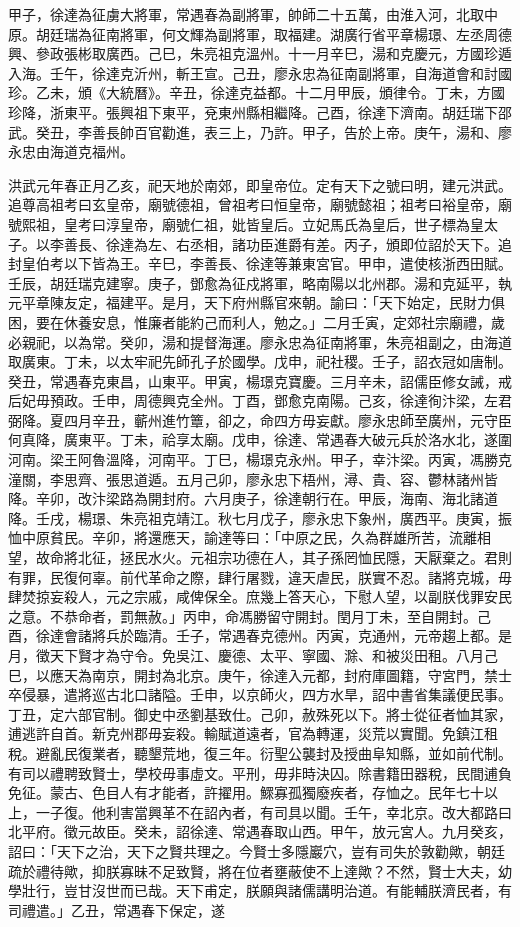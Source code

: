 \begin{pinyinscope}
甲子，徐達為征虜大將軍，常遇春為副將軍，帥師二十五萬，由淮入河，北取中原。胡廷瑞為征南將軍，何文輝為副將軍，取福建。湖廣行省平章楊璟、左丞周德興、參政張彬取廣西。己巳，朱亮祖克溫州。十一月辛巳，湯和克慶元，方國珍遁入海。壬午，徐達克沂州，斬王宣。己丑，廖永忠為征南副將軍，自海道會和討國珍。乙未，頒《大統曆》。辛丑，徐達克益都。十二月甲辰，頒律令。丁未，方國珍降，浙東平。張興祖下東平，兗東州縣相繼降。己酉，徐達下濟南。胡廷瑞下邵武。癸丑，李善長帥百官勸進，表三上，乃許。甲子，告於上帝。庚午，湯和、廖永忠由海道克福州。

洪武元年春正月乙亥，祀天地於南郊，即皇帝位。定有天下之號曰明，建元洪武。追尊高祖考曰玄皇帝，廟號德祖，曾祖考曰恒皇帝，廟號懿祖；祖考曰裕皇帝，廟號熙祖，皇考曰淳皇帝，廟號仁祖，妣皆皇后。立妃馬氏為皇后，世子標為皇太子。以李善長、徐達為左、右丞相，諸功臣進爵有差。丙子，頒即位詔於天下。追封皇伯考以下皆為王。辛巳，李善長、徐達等兼東宮官。甲申，遣使核浙西田賦。壬辰，胡廷瑞克建寧。庚子，鄧愈為征戍將軍，略南陽以北州郡。湯和克延平，執元平章陳友定，福建平。是月，天下府州縣官來朝。諭曰：「天下始定，民財力俱困，要在休養安息，惟廉者能約己而利人，勉之。」二月壬寅，定郊社宗廟禮，歲必親祀，以為常。癸卯，湯和提督海運。廖永忠為征南將軍，朱亮祖副之，由海道取廣東。丁未，以太牢祀先師孔子於國學。戊申，祀社稷。壬子，詔衣冠如唐制。癸丑，常遇春克東昌，山東平。甲寅，楊璟克寶慶。三月辛未，詔儒臣修女誡，戒后妃毋預政。壬申，周德興克全州。丁酉，鄧愈克南陽。己亥，徐達徇汴梁，左君弼降。夏四月辛丑，蘄州進竹簟，卻之，命四方毋妄獻。廖永忠師至廣州，元守臣何真降，廣東平。丁未，祫享太廟。戊申，徐達、常遇春大破元兵於洛水北，遂圍河南。梁王阿魯溫降，河南平。丁巳，楊璟克永州。甲子，幸汴梁。丙寅，馮勝克潼關，李思齊、張思道遁。五月己卯，廖永忠下梧州，潯、貴、容、鬱林諸州皆降。辛卯，改汴梁路為開封府。六月庚子，徐達朝行在。甲辰，海南、海北諸道降。壬戌，楊璟、朱亮祖克靖江。秋七月戊子，廖永忠下象州，廣西平。庚寅，振恤中原貧民。辛卯，將還應天，諭達等曰：「中原之民，久為群雄所苦，流離相望，故命將北征，拯民水火。元祖宗功德在人，其子孫罔恤民隱，天厭棄之。君則有罪，民復何辜。前代革命之際，肆行屠戮，違天虐民，朕實不忍。諸將克城，毋肆焚掠妄殺人，元之宗戚，咸俾保全。庶幾上答天心，下慰人望，以副朕伐罪安民之意。不恭命者，罰無赦。」丙申，命馮勝留守開封。閏月丁未，至自開封。己酉，徐達會諸將兵於臨清。壬子，常遇春克德州。丙寅，克通州，元帝趨上都。是月，徵天下賢才為守令。免吳江、慶德、太平、寧國、滁、和被災田租。八月己巳，以應天為南京，開封為北京。庚午，徐達入元都，封府庫圖籍，守宮門，禁士卒侵暴，遣將巡古北口諸隘。壬申，以京師火，四方水旱，詔中書省集議便民事。丁丑，定六部官制。御史中丞劉基致仕。己卯，赦殊死以下。將士從征者恤其家，逋逃許自首。新克州郡毋妄殺。輸賦道遠者，官為轉運，災荒以實聞。免鎮江租稅。避亂民復業者，聽墾荒地，復三年。衍聖公襲封及授曲阜知縣，並如前代制。有司以禮聘致賢士，學校毋事虛文。平刑，毋非時決囚。除書籍田器稅，民間逋負免征。蒙古、色目人有才能者，許擢用。鰥寡孤獨廢疾者，存恤之。民年七十以上，一子復。他利害當興革不在詔內者，有司具以聞。壬午，幸北京。改大都路曰北平府。徵元故臣。癸未，詔徐達、常遇春取山西。甲午，放元宮人。九月癸亥，詔曰：「天下之治，天下之賢共理之。今賢士多隱巖穴，豈有司失於敦勸歟，朝廷疏於禮待歟，抑朕寡昧不足致賢，將在位者壅蔽使不上達歟？不然，賢士大夫，幼學壯行，豈甘沒世而已哉。天下甫定，朕願與諸儒講明治道。有能輔朕濟民者，有司禮遣。」乙丑，常遇春下保定，遂
\end{pinyinscope}
